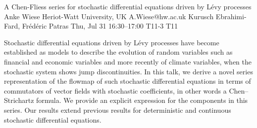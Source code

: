 \begin{talk}
  {A Chen-Fliess series for stochastic differential equations driven by L{\'e}vy processes}%
  {Anke Wiese}%
  {Heriot-Watt University, UK}%
  {A.Wiese@hw.ac.uk}%
  {Kurusch Ebrahimi-Fard, Fr{\'e}d{\'e}ric Patras}%
  {}%
  {Thu, Jul 31 16:30--17:00}%
  {T11-3}%
  {T11}%
  
    

Stochastic differential equations driven by L{\'e}vy processes have become established as models to describe the evolution of random variables such as financial and economic variables and more recently of climate variables, when the stochastic system shows jump discontinuities. In this talk, we derive a novel series representation of the flowmap of such stochastic 
differential equations 
in terms of commutators of vector fields with stochastic 
coefficients, in other words a Chen--Strichartz formula. We provide an explicit expression for the components in this series. 
Our results extend previous results
for deterministic and continuous stochastic differential equations.  
\end{talk}

